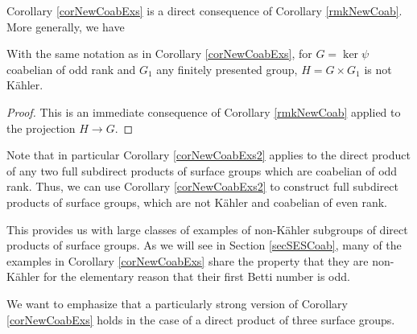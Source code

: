 Corollary \ref{corNewCoabExs} is a direct consequence of Corollary \ref{rmkNewCoab}. More generally, we have 

\begin{corollary}
\label{corNewCoabExs2}
 With the same notation as in Corollary \ref{corNewCoabExs}, for $G=\ker \psi$ coabelian of odd rank and $G_1$ any finitely presented group, $H=G \times G_1$ is not K\"ahler. 
\end{corollary}
\begin{proof}
This is an immediate consequence of Corollary \ref{rmkNewCoab} applied to the projection $H\to G$.
\end{proof}

\begin{remark}
 Note that in particular Corollary \ref{corNewCoabExs2} applies to the direct product of any two full subdirect products of surface groups which are coabelian of odd rank. Thus, we can use Corollary \ref{corNewCoabExs2} to construct full subdirect products of surface groups, which are not K\"ahler and coabelian of even rank.
 \label{remNewCoabExs}
\end{remark}

This provides us with large classes of examples of non-K\"ahler subgroups of direct products of surface groups. As we will see in Section \ref{secSESCoab}, many of the examples in Corollary \ref{corNewCoabExs} share the property that they are non-K\"ahler for the elementary reason that their first Betti number is odd.

We want to emphasize that a particularly strong version of Corollary \ref{corNewCoabExs} holds in the case of a direct product of three surface groups.


